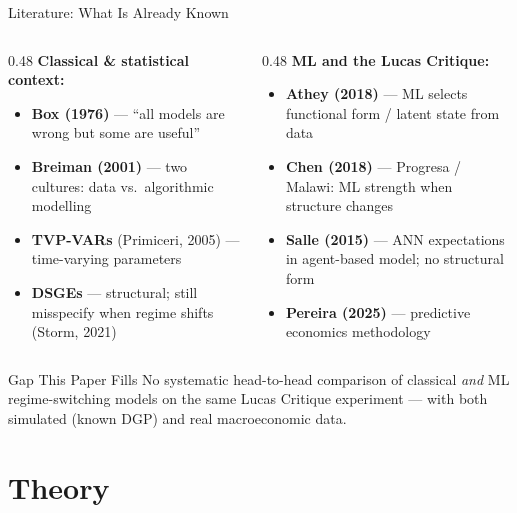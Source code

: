 \documentclass[aspectratio=169, 10pt]{beamer}
\begin{document}
\begin{frame}{Literature: What Is Already Known}

  \begin{columns}[T]
    \begin{column}{0.48\textwidth}
      \textbf{Classical \& statistical context:}
      \begin{itemize}\setlength\itemsep{3pt}
        \item \textbf{Box (1976)} — ``all models are wrong but some are useful''
        \item \textbf{Breiman (2001)} — two cultures: data vs.\ algorithmic modelling
        \item \textbf{TVP-VARs} (Primiceri, 2005) — time-varying parameters
        \item \textbf{DSGEs} — structural; still misspecify when regime shifts (Storm, 2021)
      \end{itemize}
    \end{column}
    \begin{column}{0.48\textwidth}
      \textbf{ML and the Lucas Critique:}
      \begin{itemize}\setlength\itemsep{3pt}
        \item \textbf{Athey (2018)} — ML selects functional form / latent state from data
        \item \textbf{Chen (2018)} — Progresa / Malawi: ML strength when structure changes
        \item \textbf{Salle (2015)} — ANN expectations in agent-based model; no structural form
        \item \textbf{Pereira (2025)} — predictive economics methodology
      \end{itemize}
    \end{column}
  \end{columns}

  \vspace{8pt}
  \begin{block}{Gap This Paper Fills}
    No systematic head-to-head comparison of classical \emph{and} ML regime-switching models on the same Lucas Critique experiment — with both simulated (known DGP) and real macroeconomic data.
  \end{block}

\end{frame}

\section{Theory}
\end{document}
